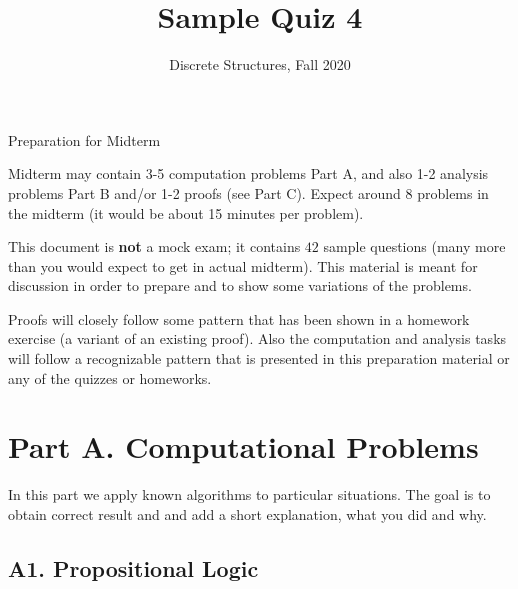 \documentclass[jou]{apa6}
\title{Sample Quiz 4}
\author{Discrete Structures, Fall 2020}
\affiliation{RBS}
\begin{document}
\thispagestyle{empty}

\twocolumn
{\Large Preparation for Midterm}

Midterm may contain 3-5 computation problems \textendash{}
Part A, and also 1-2 analysis problems \textendash{} Part B and/or 
1-2 proofs (see Part C). Expect around 8 problems in the midterm (it would be 
about 15 minutes per problem). 

This document is {\bf not} a mock exam; it contains $42$ sample questions
(many more than you would expect to get in actual midterm). This material 
is meant for discussion in order to prepare and to show some variations of the 
problems.

Proofs will closely follow some pattern that has been shown in a homework 
exercise (a variant of an existing proof). 
Also the computation and analysis tasks will follow a 
recognizable pattern that is presented in this preparation material 
or any of the quizzes or homeworks.




\section{Part A. Computational Problems}

In this part we apply known algorithms to particular situations. 
The goal is to obtain correct result and and add a short explanation, what 
you did and why.

\subsection{A1. Propositional Logic}
\end{document}
